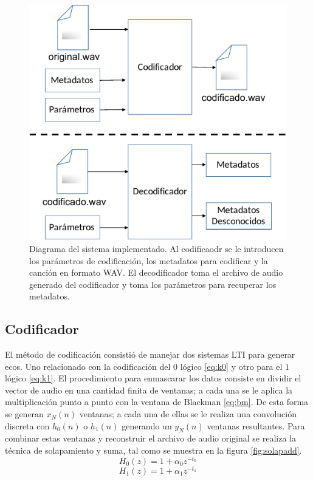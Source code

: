 \documentclass[conference]{IEEEtran}
\begin{document}
\begin{figure}[h]
\centering
\includegraphics[scale=0.7]{sistema.pdf}
\caption{Diagrama del sistema implementado. Al codificaodr se le introducen los parámetros de codificación, los metadatos para codificar y la canción en formato WAV. El decodificador toma el archivo de audio generado del codificador y toma los parámetros para recuperar los metadatos.}
\label{fig:sistema}
\end{figure}

\subsection{Codificador}
El método de codificación consistió de manejar dos sistemas LTI para generar ecos. Uno relacionado con la codificación del $0$ lógico \eqref{eq:k0} y otro para el $1$ lógico \eqref{eq:k1}. El procedimiento para enmascarar los datos consiste en dividir el vector de audio en una cantidad finita de ventanas; a cada una se le aplica la multiplicación punto a punto con la ventana de Blackman \eqref{eq:bm}. De esta forma se generan $x_N(n)$ ventanas; a cada una de ellas se le realiza una convolución discreta con $h_0(n)$ o $h_1(n)$ generando un $y_N(n)$ ventanas resultantes. Para combinar estas ventanas y reconstruir el archivo de audio original se realiza la técnica de solapamiento y suma, tal como se muestra en la figura \ref{fig:solapadd}.
\begin{equation}
H_0(z)=1+\alpha_0 z^{-t_0}
\label{eq:k0}
\end{equation}
\begin{equation}
H_1(z)=1+\alpha_1 z^{-t_1}
\label{eq:k1}
\end{equation}
\end{document}
